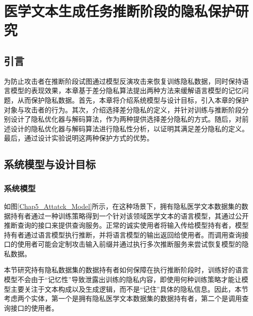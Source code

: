 
\chapter{医学文本生成任务推断阶段的隐私保护研究}

\section{引言}

为防止攻击者在推断阶段试图通过模型反演攻击来恢复训练隐私数据，同时保持语言模型的表现效果，本章基于差分隐私算法提出两种方法来缓解语言模型的记忆问题，从而保护隐私数据。首先，本章将介绍系统模型与设计目标，引入本章的保护对象与攻击者的行为。其次，介绍选择差分隐私的定义，并针对训练与推断阶段分别设计了隐私优化器与解码算法，作为两种提供选择差分隐私的方式。随后，对前述设计的隐私优化器与解码算法进行隐私性分析，以证明其满足差分隐私的定义。最后，通过设计实验说明这两种保护方式的优势。

\section{系统模型与设计目标}

\subsection{系统模型}

如图\ref{Chap5_Attatck_Model}所示，在这种场景下，拥有隐私医学文本数据集的数据持有者通过一种训练策略得到一个针对该领域医学文本的语言模型，其通过公开推断查询的接口来提供查询服务。正常的诚实使用者将输入传给模型持有者，模型持有者通过语言模型执行推断，并将语言模型的输出返回给使用者。而调用查询接口的使用者可能会定制攻击输入前缀并通过执行多次推断服务来尝试恢复模型的隐私数据。

本节研究持有隐私数据集的数据持有者如何保障在执行推断阶段时，训练好的语言模型不会由于“记忆性”导致泄露出训练的隐私内容，即使用何种训练策略才能让模型主要关注于文本构成以及生成逻辑，而不是“记住”具体的隐私信息。因此，本节考虑两个实体，第一个是拥有隐私医学文本数据集的数据持有者，第二个是调用查询接口的使用者。





